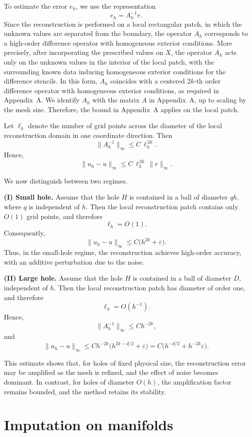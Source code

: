 \documentclass[11pt,oneside,reqno]{amsart}
\theoremstyle{plain}
\numberwithin{equation}{section}
\begin{document}
To estimate the error $e_h$,
we use the representation
\[
e_h = A_h^{-1} r.
\]
Since the reconstruction is performed
on a local rectangular patch,
in which the unknown values are separated
from the boundary,
the operator $A_h$ corresponds
to a high-order difference operator
with homogeneous exterior conditions.
More precisely, after incorporating the prescribed values on $X$, 
the operator $A_h$ acts only on the unknown values in the interior 
of the local patch, with the surrounding known data inducing 
homogeneous exterior conditions for the difference stencils. 
In this form, $A_h$ coincides with a centered $2k$-th order 
difference operator with homogeneous exterior conditions, 
as required in Appendix~A. We identify $A_h$ with the matrix $A$ in Appendix~A, up to scaling 
by the mesh size.
Therefore, the bound in Appendix~A applies
on the local patch.

Let $\ell_h$ denote the number of grid points
across the diameter of the local reconstruction domain in one coordinate direction.
Then
\[
\|A_h^{-1}\|_\infty \le C\, \ell_h^{\,2k}.
\]
Hence,
\[
\|u_h - u\|_\infty
\le C\, \ell_h^{\,2k}\, \|r\|_\infty.
\]

We now distinguish between two regimes.

\medskip
\noindent
\textbf{(I) Small hole.}
Assume that the hole $H$
is contained in a ball
of diameter $qh$,
where $q$ is independent of $h$.
Then the local reconstruction patch
contains only $O(1)$ grid points,
and therefore
\[
\ell_h = O(1).
\]
Consequently,
\[
\|u_h - u\|_\infty
\le C \bigl(h^{2k} + \varepsilon\bigr).
\]
Thus, in the small-hole regime,
the reconstruction achieves
high-order accuracy,
with an additive perturbation
due to the noise.

\medskip
\noindent
\textbf{(II) Large hole.}
Assume that the hole $H$
is contained in a ball
of diameter $D$,
independent of $h$.
Then the local reconstruction patch
has diameter of order one,
and therefore
\[
\ell_h = O(h^{-1}).
\]
Hence,
\[
\|A_h^{-1}\|_\infty \le C h^{-2k},
\]
and
\[
\|u_h - u\|_\infty
\le C h^{-2k}
\bigl(h^{2k-d/2} + \varepsilon\bigr)
= C \bigl(h^{-d/2} + h^{-2k}\varepsilon\bigr).
\]

This estimate shows that,
for holes of fixed physical size,
the reconstruction error may be amplified
as the mesh is refined,
and the effect of noise becomes dominant.
In contrast,
for holes of diameter $O(h)$,
the amplification factor remains bounded,
and the method retains its stability.
\
\section{Imputation on manifolds}
\end{document}
